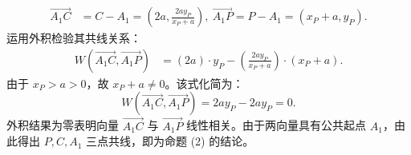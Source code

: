\begin{solution}
\begin{align*}
\overrightarrow{A_1C} &= C - A_1 = \left( 2a, \frac{2a y_P}{x_P + a} \right), ~\overrightarrow{A_1P} = P - A_1 = (x_P + a, y_P).
\end{align*}
运用外积检验其共线关系：
\begin{align*}
W(\overrightarrow{A_1C}, \overrightarrow{A_1P}) &= (2a) \cdot y_P - \left( \frac{2a y_P}{x_P + a} \right) \cdot (x_P + a).
\end{align*}
由于 $x_P > a > 0$，故 $x_P + a \neq 0$。该式化简为：
\[ W(\overrightarrow{A_1C}, \overrightarrow{A_1P}) = 2a y_P - 2a y_P = 0. \]
外积结果为零表明向量 $\overrightarrow{A_1C}$ 与 $\overrightarrow{A_1P}$ 线性相关。由于两向量具有公共起点 $A_1$，由此得出 $P, C, A_1$ 三点共线，即为命题 (2) 的结论。
\end{solution}



